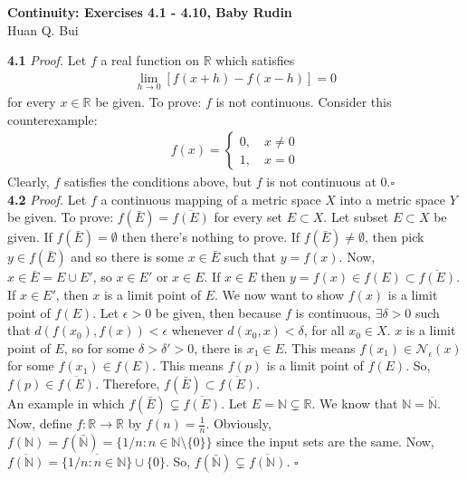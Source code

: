 \documentclass[11pt]{article}
\begin{document}
\begin{center}
{\Large\bf  Continuity:  Exercises 4.1 - 4.10, Baby Rudin}\\
$\,$\\
{\Large  Huan Q. Bui}
\end{center}


\noindent \textbf{4.1} 
\noindent \textit{Proof.} Let $f$ a real function on $\mathbb{R}$ which satisfies 
\begin{align*}
\lim_{h\to 0}[f(x+h) - f(x-h)] = 0
\end{align*}
for every $x \in \mathbb{R}$ be given. {To prove}: $f$ is not continuous. Consider this counterexample:
\begin{align*}
f(x) = \begin{cases}
0, \quad x \neq 0\\
1, \quad x = 0 
\end{cases}
\end{align*}
Clearly, $f$ satisfies the conditions above, but $f$ is not continuous at $0$.\hfill $\square$\\



\noindent \textbf{4.2} 
\noindent \textit{Proof.} Let $f$ a continuous mapping of a metric space $X$ into a metric space $Y$ be given. {To prove}: $f(\bar{E}) = \overline{f(E)}$ for every set $E \subset X$. Let subset $E \subset X$ be given. If $f(\bar{E}) = \emptyset$ then there's nothing to prove. If $f(\bar{E}) \neq \emptyset$, then pick $y \in f(\bar{E})$ and so there is some $x\in \bar{E}$ such that $y = f(x)$. Now, $x \in \bar{E} = E \cup E'$, so $x \in E'$ or $x \in E$. If $x\in E$ then $y = f(x) \in f(E) \subset \overline{f(E)} $. If $x \in E'$, then $x$ is a limit point of $E$. We now want to show $f(x)$ is a limit point of $f(E)$. Let $\epsilon > 0$ be given, then because $f$ is continuous, $\exists \delta > 0$ such that $d(f(x_0), f(x)) < \epsilon$ whenever $d(x_0 ,x) < \delta$, for all $x_0 \in X$. $x$ is a limit point of $E$, so for some $\delta > \delta' > 0$, there is $x_1 \in E$. This means $f(x_1) \in \mathcal{N}_\epsilon (x)$ for some $f(x_1) \in f(E)$. This means $f(p)$ is a limit point of $f(E)$. So, $f(p) \in \overline{f(E)}$. Therefore, $f(\bar{E}) \subset \overline{f(E)}$. \\

An example in which $ f(\bar{E}) \subsetneq \overline{f(E)} $. Let $E = \mathbb{N} \subsetneq \mathbb{R}$. We know that $\mathbb{N} = \overline{\mathbb{N}}$. Now, define $f: \mathbb{R} \to \mathbb{R}$ by $f(n) = \frac{1}{n}$. Obviously, $f(\mathbb{N}) = f(\bar{\mathbb{N}}) = \{ 1/n : n \in \mathbb{N}\setminus \{ 0 \} \}$ since the input sets are the same. Now, $\overline{f(\mathbb{N})} = \overline{ \{ 1/n : n\in \mathbb{N} \} } \cup \{ 0 \}$.  So, $f(\bar{\mathbb{N}}) \subsetneq \overline{f(\mathbb{N})}$.  \hfill $\square$\\
\end{document}
